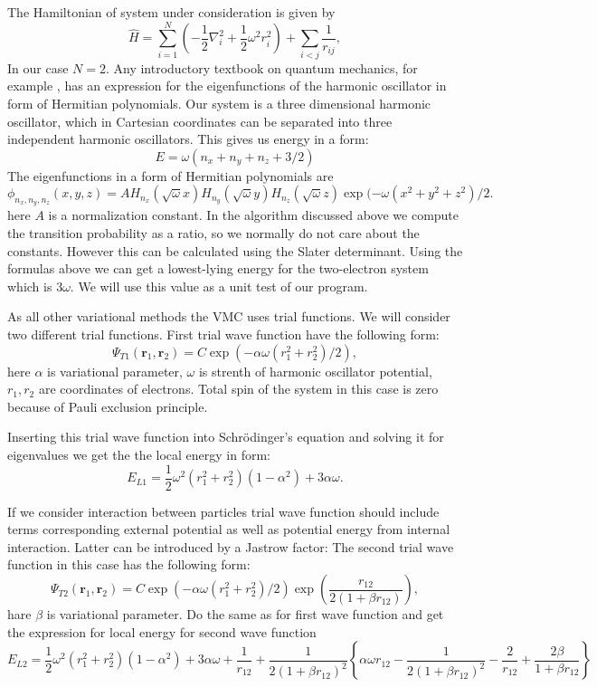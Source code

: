 \documentclass[10pt]{article}
\begin{document}
The Hamiltonian of system under consideration is given by
\begin{equation}
  \label{eq:finalH}
  \hat{H}=\sum_{i=1}^{N} \left(  -\frac{1}{2} \nabla_i^2 + \frac{1}{2} \omega^2r_i^2  \right)+\sum_{i<j}\frac{1}{r_{ij}},
\end{equation}
In our case $N=2$. 
Any introductory textbook on quantum mechanics, for example \cite{Liboff}, has an expression for the eigenfunctions of the harmonic oscillator in form of Hermitian polynomials.  Our system is a three dimensional harmonic oscillator, which in Cartesian coordinates can be separated into three independent harmonic oscillators. This gives us energy in a form:
\begin{equation*}
E=\omega(n_x+n_y+n_z+3/2) 
  \end{equation*}
  The eigenfunctions in a form of Hermitian polynomials are
\begin{equation*}
  \phi_{n_x,n_y,n_z}(x,y,z) = A H_{n_x}(\sqrt{\omega}x)H_{n_y}(\sqrt{\omega}y)H_{n_z}(\sqrt{\omega}z)\exp{(-\omega(x^2+y^2+z^2)/2}.
  \end{equation*}
 here $A$ is a normalization constant. In the algorithm discussed above we compute the transition probability as a ratio, so we normally do not care about the constants. However this can be calculated using the Slater determinant. 
 Using the formulas above we can get a lowest-lying energy for the two-electron system which is $3\omega$. We will use this value as a unit test of our program.

As all other variational methods the VMC uses trial functions. We will consider two different trial functions. 
First trial wave function have the following form:
\[
   \Psi_{T1}(\mathbf{r}_1,\mathbf{r}_2) = C\exp{\left(-\alpha\omega(r_1^2+r_2^2)/2\right)},
\]
here  $\alpha$ is variational parameter, $\omega$ is strenth of harmonic oscillator potential, $r_1, r_2$ are coordinates of electrons. Total spin of the system in this case is zero because of Pauli exclusion principle.

Inserting this trial wave function into Schr\"{o}dinger's equation and solving it for eigenvalues we get the the local energy in form: 
\[ 
E_{L1} = \frac{1}{2}\omega^2\left( r_1^2+r_2^2\right)\left(1-\alpha^2\right) +3\alpha\omega.
\]

If we consider interaction between particles trial wave function should include terms corresponding external potential as well as potential energy from internal interaction. Latter can be introduced by a Jastrow factor:
The second trial wave function in this case has the following form:
\[
    \Psi_{T2}(\mathbf{r}_1,\mathbf{r}_2) =
    C\exp{\left(-\alpha\omega(r_1^2+r_2^2)/2\right)}
    \exp{\left(\frac{r_{12}}{2(1+\beta r_{12})}\right)},
\]
hare $\beta$ is variational parameter.
Do the same as for first wave function and get the expression for local energy for second wave function
\[ 
E_{L2} = \frac{1}{2}\omega^2\left( r_1^2+r_2^2\right)\left(1-\alpha^2\right) +3\alpha\omega+\frac{1}{r_{12}}+\frac{1}{2(1+\beta r_{12})^2} 
\left\{\alpha\omega r_{12}-\frac{1}{2(1+\beta r_{12})^2}-\frac{2}{r_{12}}+\frac{2\beta}{1+\beta r_{12}}\right\}
\]
\end{document}
